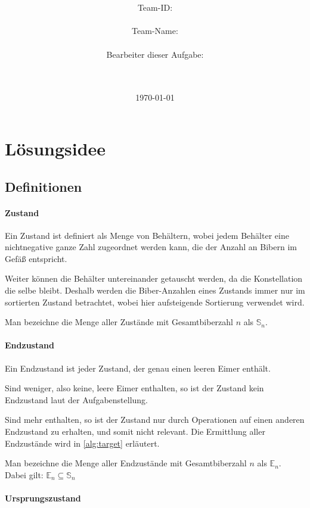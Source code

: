 \documentclass[a4paper,10pt,ngerman]{scrartcl}
\title{\textbf{\Huge\Aufgabe}}
\author{\LARGE Team-ID: \LARGE \TeamID \\\\
	    \LARGE Team-Name: \LARGE \TeamName \\\\
	    \LARGE Bearbeiter dieser Aufgabe: \\ 
	    \LARGE \Namen\\\\}
\date{\LARGE\today}
\begin{document}
\maketitle
\tableofcontents

\vspace{0.5cm}

\section{Lösungsidee}

\subsection{Definitionen}

\paragraph{Zustand} \label{def:state}

Ein Zustand ist definiert als Menge von Behältern, wobei jedem Behälter eine nichtnegative ganze Zahl zugeordnet werden kann, die der Anzahl an Bibern im Gefäß entspricht.

Weiter können die Behälter untereinander getauscht werden, da die Konstellation die selbe bleibt. Deshalb werden die Biber-Anzahlen eines Zustands immer nur im sortierten Zustand betrachtet, wobei hier aufsteigende Sortierung verwendet wird.

Man bezeichne die Menge aller Zustände mit Gesamtbiberzahl \(n\) als \(\mathbb{S}_n\).

\paragraph{Endzustand} \label{def:target}

Ein Endzustand ist jeder Zustand, der genau einen leeren Eimer enthält.

Sind weniger, also keine, leere Eimer enthalten, so ist der Zustand kein Endzustand laut der Aufgabenstellung.

Sind mehr enthalten, so ist der Zustand nur durch Operationen auf einen anderen Endzustand zu erhalten, und somit nicht relevant. Die Ermittlung aller Endzustände wird in \cref{alg:target} erläutert.

Man bezeichne die Menge aller Endzustände mit Gesamtbiberzahl \(n\) als \(\mathbb{E}_n\).
Dabei gilt: \(\mathbb{E}_n\subseteq\mathbb{S}_n\)

\paragraph{Ursprungszustand} \label{def:origin}
\end{document}

